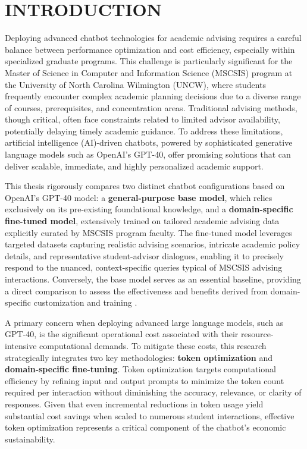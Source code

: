 \documentclass[12pt,oneside,openany]{report}
\begin{document}
\clearpage


\pagestyle{fancy}   %
\fancyhf{}          %
\cfoot{\thepage}    %


\chapter{INTRODUCTION}


Deploying advanced chatbot technologies for academic advising requires a careful balance between performance optimization and cost efficiency, especially within specialized graduate programs. This challenge is particularly significant for the Master of Science in Computer and Information Science (MSCSIS) program at the University of North Carolina Wilmington (UNCW), where students frequently encounter complex academic planning decisions due to a diverse range of courses, prerequisites, and concentration areas. Traditional advising methods, though critical, often face constraints related to limited advisor availability, potentially delaying timely academic guidance. To address these limitations, artificial intelligence (AI)-driven chatbots, powered by sophisticated generative language models such as OpenAI’s GPT-40, offer promising solutions that can deliver scalable, immediate, and highly personalized academic support.

This thesis rigorously compares two distinct chatbot configurations based on OpenAI’s GPT-40 model: a \textbf{general-purpose base model}, which relies exclusively on its pre-existing foundational knowledge, and a \textbf{domain-specific fine-tuned model}, extensively trained on tailored academic advising data explicitly curated by MSCSIS program faculty. The fine-tuned model leverages targeted datasets capturing realistic advising scenarios, intricate academic policy details, and representative student-advisor dialogues, enabling it to precisely respond to the nuanced, context-specific queries typical of MSCSIS advising interactions. Conversely, the base model serves as an essential baseline, providing a direct comparison to assess the effectiveness and benefits derived from domain-specific customization and training \cite{openai2024}.

A primary concern when deploying advanced large language models, such as GPT-40, is the significant operational cost associated with their resource-intensive computational demands. To mitigate these costs, this research strategically integrates two key methodologies: \textbf{token optimization} and \textbf{domain-specific fine-tuning}. Token optimization targets computational efficiency by refining input and output prompts to minimize the token count required per interaction without diminishing the accuracy, relevance, or clarity of responses. Given that even incremental reductions in token usage yield substantial cost savings when scaled to numerous student interactions, effective token optimization represents a critical component of the chatbot’s economic sustainability.
\end{document}
